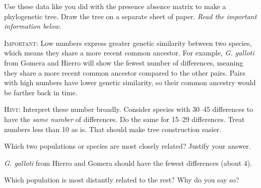 \documentclass[12pt, hidelinks]{exam}
\newcommand*\AnswerBox[2]{%
    \parbox[t][#1]{0.92\textwidth}{%
    \begin{solution}#2\end{solution}}
    \vspace{\stretch{1}}
}
\begin{document}
\begin{questions}
{
}

\question \label{genetic_phylogeny}
Use these data like you did with the presence absence matrix to make a phylogenetic tree. Draw the tree on a separate sheet of paper. \emph{Read the important information below.}

\textsc{Important:} Low numbers express greater genetic similarity between two species, which means they share a more recent common ancestor. For example, \textit{G. galloti} from Gomera and Hierro will show the fewest number of differences, meaning they share a more recent common ancestor compared to the other pairs. Pairs with high numbers have lower genetic similarity, so their common ancestry would be farther back in time.

\textsc{Hint:} Interpret these number broadly. Consider species with 30–45 differences to have the \emph{same number} of differences. Do the same for 15–29 differences. Treat numbers less than 10 as is. That should make tree construction easier. 

\question
Which two populations or species are most closely related? Justify your answer. 

\AnswerBox{2\baselineskip}{\textit{G. galloti} from Hierro and Gomera should have the fewest differences (about 4).}

\question
Which population is most distantly related to the rest? Why do you say so? 


\end{questions}
\end{document}
